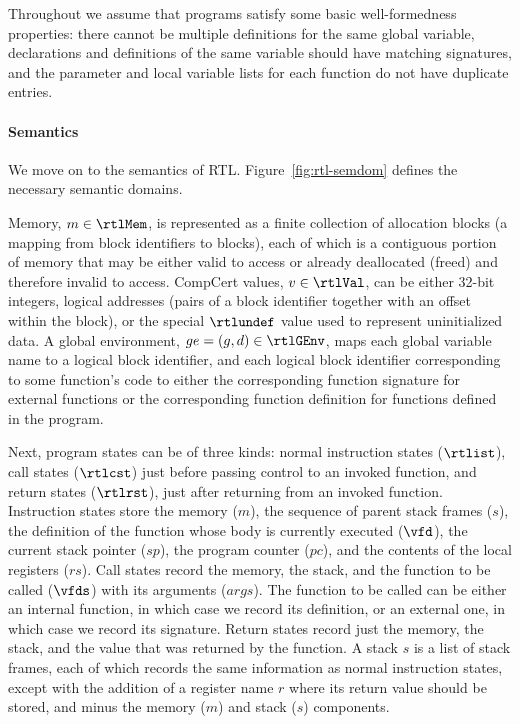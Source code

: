 Throughout we assume that programs satisfy some basic well-formedness properties: there cannot be
multiple definitions for the same global variable, declarations and definitions of the same variable
should have matching signatures, and the parameter and local variable lists for each function do not
have duplicate entries.


\paragraph{Semantics}


% 

We move on to the semantics of RTL.  Figure~\ref{fig:rtl-semdom} defines the necessary semantic
domains.

Memory, $m\in\rtlMem$, is represented as a finite collection of allocation blocks (a mapping from
block identifiers to blocks), each of which is a contiguous portion of memory that may be either
valid to access or already deallocated (freed) and therefore invalid to access.  CompCert values,
$v\in\rtlVal$, can be either 32-bit integers, logical addresses (pairs of a block identifier
together with an offset within the block), or the special $\rtlundef$ value used to represent
uninitialized data.  A global environment, $ge=(g,d)\in\rtlGEnv$, maps each global variable name to
a logical block identifier, and each logical block identifier corresponding to some function's code
to either the corresponding function signature for external functions or the corresponding function
definition for functions defined in the program.

Next, program states can be of three kinds: normal instruction states ($\rtlist$), call states
($\rtlcst$) just before passing control to an invoked function, and return states ($\rtlrst$), just
after returning from an invoked function.  Instruction states store the memory ($m$), the sequence
of parent stack frames ($s$), the definition of the function whose body is currently executed
($\vfd$), the current stack pointer ($sp$), the program counter ($pc$), and the contents of the
local registers ($rs$).  Call states record the memory, the stack, and the function to be called
($\vfds$) with its arguments ($args$).  The function to be called can be either an internal
function, in which case we record its definition, or an external one, in which case we record its
signature.  Return states record just the memory, the stack, and the value that was returned by the
function.  A stack $s$ is a list of stack frames, each of which records the same information as
normal instruction states, except with the addition of a register name $r$ where its return value
should be stored, and minus the memory ($m$) and stack ($s$) components.

